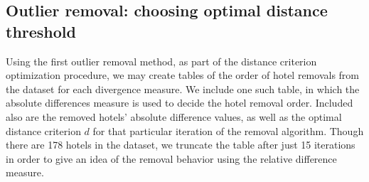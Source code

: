 \documentclass[useAMS, usenatbib]{biom}
\begin{document}
\subsection{Outlier removal: choosing optimal distance threshold}
\label{ss:optimization}

Using the first outlier removal method, as part of the distance criterion optimization procedure, we may create tables of the order of hotel removals from the dataset for each divergence measure. We include one such table, in which the absolute differences measure is used to decide the hotel removal order. Included also are the removed hotels' absolute difference values, as well as the optimal distance criterion $d$ for that particular iteration of the removal algorithm. Though there are 178 hotels in the dataset, we truncate the table after just 15 iterations in order to give an idea of the removal behavior using the relative difference measure.
\end{document}

